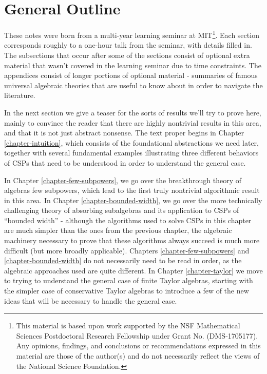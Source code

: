 \section{General Outline}

These notes were born from a multi-year learning seminar at MIT\footnote{This material is based upon work supported by the NSF Mathematical Sciences Postdoctoral Research Fellowship under Grant No. (DMS-1705177). Any opinions, findings, and conclusions or recommendations expressed in this material are those of the author(s) and do not necessarily reflect the views of the National Science Foundation.}. Each section corresponds roughly to a one-hour talk from the seminar, with details filled in. The subsections that occur after some of the sections consist of optional extra material that wasn't covered in the learning seminar due to time constraints. The appendices consist of longer portions of optional material - summaries of famous universal algebraic theories that are useful to know about in order to navigate the literature.

In the next section we give a teaser for the sorts of results we'll try to prove here, mainly to convince the reader that there are highly nontrivial results in this area, and that it is not just abstract nonsense. The text proper begins in Chapter \ref{chapter-intuition}, which consists of the foundational abstractions we need later, together with several fundamental examples illustrating three different behaviors of CSPs that need to be understood in order to understand the general case.

In Chapter \ref{chapter-few-subpowers}, we go over the breakthrough theory of algebras few subpowers, which lead to the first truly nontrivial algorithmic result in this area. In Chapter \ref{chapter-bounded-width}, we go over the more technically challenging theory of absorbing subalgebras and its application to CSPs of ``bounded width'' - although the algorithms used to solve CSPs in this chapter are much simpler than the ones from the previous chapter, the algebraic machinery necessary to prove that these algorithms always succeed is much more difficult (but more broadly applicable). Chapters \ref{chapter-few-subpowers} and \ref{chapter-bounded-width} do not necessarily need to be read in order, as the algebraic approaches used are quite different. In Chapter \ref{chapter-taylor} we move to trying to understand the general case of finite Taylor algebras, starting with the simpler case of conservative Taylor algebras to introduce a few of the new ideas that will be necessary to handle the general case.

